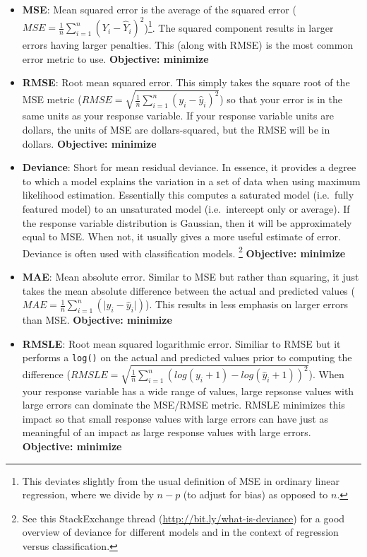 \documentclass[]{krantz}
\begin{document}
\begin{itemize}
\item
  \textbf{MSE}: Mean squared error is the average of the squared error (\(MSE = \frac{1}{n} \sum^n_{i=1}(Y_i - \hat Y_i)^2\))\footnote{This deviates slightly from the usual definition of MSE in ordinary linear regression, where we divide by \(n-p\) (to adjust for bias) as opposed to \(n\).}. The squared component results in larger errors having larger penalties. This (along with RMSE) is the most common error metric to use. \textbf{Objective: minimize}
\item
  \textbf{RMSE}: Root mean squared error. This simply takes the square root of the MSE metric (\(RMSE = \sqrt{\frac{1}{n} \sum^n_{i=1}(y_i - \hat y_i)^2}\)) so that your error is in the same units as your response variable. If your response variable units are dollars, the units of MSE are dollars-squared, but the RMSE will be in dollars. \textbf{Objective: minimize}
\item
  \textbf{Deviance}: Short for mean residual deviance. In essence, it provides a degree to which a model explains the variation in a set of data when using maximum likelihood estimation. Essentially this computes a saturated model (i.e.~fully featured model) to an unsaturated model (i.e.~intercept only or average). If the response variable distribution is Gaussian, then it will be approximately equal to MSE. When not, it usually gives a more useful estimate of error. Deviance is often used with classification models. \footnote{See this StackExchange thread (\url{http://bit.ly/what-is-deviance}) for a good overview of deviance for different models and in the context of regression versus classification.} \textbf{Objective: minimize}
\item
  \textbf{MAE}: Mean absolute error. Similar to MSE but rather than squaring, it just takes the mean absolute difference between the actual and predicted values (\(MAE = \frac{1}{n} \sum^n_{i=1}(\vert y_i - \hat y_i \vert)\)). This results in less emphasis on larger errors than MSE. \textbf{Objective: minimize}
\item
  \textbf{RMSLE}: Root mean squared logarithmic error. Similiar to RMSE but it performs a \texttt{log()} on the actual and predicted values prior to computing the difference (\(RMSLE = \sqrt{\frac{1}{n} \sum^n_{i=1}(log(y_i + 1) - log(\hat y_i + 1))^2}\)). When your response variable has a wide range of values, large repsonse values with large errors can dominate the MSE/RMSE metric. RMSLE minimizes this impact so that small response values with large errors can have just as meaningful of an impact as large response values with large errors. \textbf{Objective: minimize}

\end{itemize}
\end{document}
